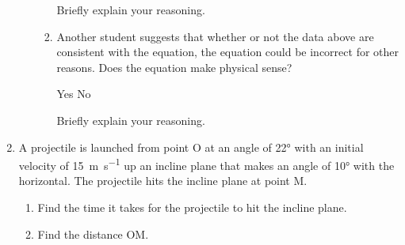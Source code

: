 \documentclass{../../../oss-apphys}
\begin{document}
\begin{enumerate}[leftmargin=15pt]
\begin{enumerate}[nosep]
\begin{enumerate}[nosep]
      \vspace{.1in}Briefly explain your reasoning.\vspace{.4in}

    \item Another student suggests that whether or not the data above are
      consistent with the equation, the equation could be incorrect for other
      reasons. Does the equation make physical sense?

      \vspace{.1in}
      \underline{\hspace{.25in}} Yes\hspace{.5in}
      \underline{\hspace{.25in}} No
    
      \vspace{.1in}Briefly explain your reasoning.\vspace{1in}
    \end{enumerate}
  \end{enumerate}
  \newpage
  
\item A projectile is launched from point O at an angle of \ang{22} with an
  initial velocity of \SI{15}{\metre\per\second} up an incline plane that makes
  an angle of \ang{10} with the horizontal. The projectile hits the incline
  plane at point M.
  \begin{center}
  \end{center}
  \begin{enumerate}[nosep]
  \item Find the time it takes for the projectile to hit the incline plane.
  \item Find the distance OM.
  \end{enumerate}
  


\end{enumerate}
\end{document}
